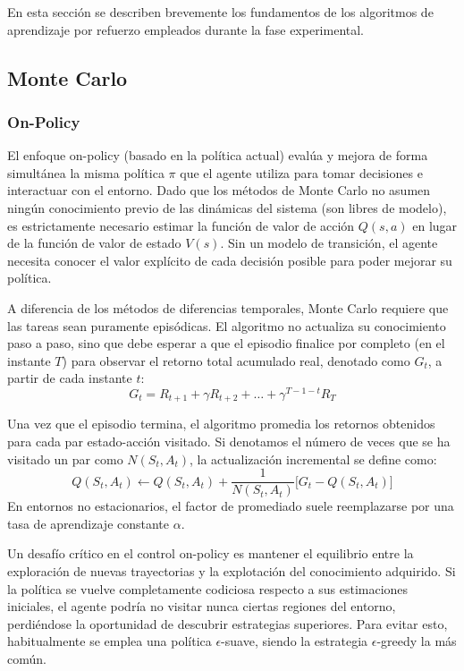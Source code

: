 En esta sección se describen brevemente los fundamentos de los algoritmos de aprendizaje por refuerzo empleados durante la fase experimental. 

\subsection{Monte Carlo}

\subsubsection{On-Policy}

El enfoque on-policy (basado en la política actual) evalúa y mejora de forma simultánea la misma política $\pi$ que el agente utiliza para tomar decisiones e interactuar con el entorno. Dado que los métodos de Monte Carlo no asumen ningún conocimiento previo de las dinámicas del sistema (son libres de modelo), es estrictamente necesario estimar la función de valor de acción $Q(s, a)$ en lugar de la función de valor de estado $V(s)$. Sin un modelo de transición, el agente necesita conocer el valor explícito de cada decisión posible para poder mejorar su política.

A diferencia de los métodos de diferencias temporales, Monte Carlo requiere que las tareas sean puramente episódicas. El algoritmo no actualiza su conocimiento paso a paso, sino que debe esperar a que el episodio finalice por completo (en el instante $T$) para observar el retorno total acumulado real, denotado como $G_t$, a partir de cada instante $t$:
$$G_t = R_{t+1} + \gamma R_{t+2} + \dots + \gamma^{T-1-t} R_T$$

Una vez que el episodio termina, el algoritmo promedia los retornos obtenidos para cada par estado-acción visitado. Si denotamos el número de veces que se ha visitado un par como $N(S_t, A_t)$, la actualización incremental se define como:
$$Q(S_t, A_t) \leftarrow Q(S_t, A_t) + \frac{1}{N(S_t, A_t)} \Big[ G_t - Q(S_t, A_t) \Big]$$
En entornos no estacionarios, el factor de promediado suele reemplazarse por una tasa de aprendizaje constante $\alpha$.

Un desafío crítico en el control on-policy es mantener el equilibrio entre la exploración de nuevas trayectorias y la explotación del conocimiento adquirido. Si la política se vuelve completamente codiciosa respecto a sus estimaciones iniciales, el agente podría no visitar nunca ciertas regiones del entorno, perdiéndose la oportunidad de descubrir estrategias superiores. Para evitar esto, habitualmente se emplea una política $\epsilon$-suave, siendo la estrategia $\epsilon$-greedy la más común. 

